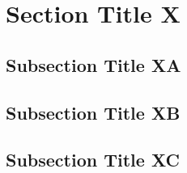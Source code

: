 
\clearpage
\section{Section Title X}
\label{sec:section-x}


\subsection{Subsection Title XA}
\label{sec:subsection-xa}


\subsection{Subsection Title XB}
\label{sec:subsection-xb}


\subsection{Subsection Title XC}
\label{sec:subsection-xc}


